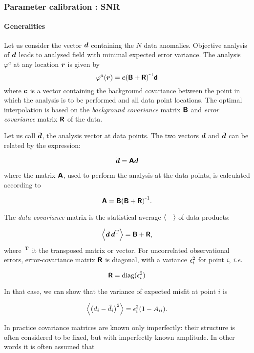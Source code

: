 \begin{frame}[allowframebreaks]
\frametitle{Parameter calibration : SNR}
\framesubtitle{Generalities}

Let us consider the vector $\mbox{\boldmath $ d $}$ containing the $N$ data anomalies. Objective analysis of $\mbox{\boldmath $ d $}$ leads to analysed field with minimal expected error variance. The analysis $\varphi^a$ at any location $\mbox{\boldmath $ r $}$ is given by
\begin{equation}
\varphi^a(\mbox{\boldmath $ r $}) = \mbox{\boldmath $ c $} {( \mbox{\boldmath $ \protect\mathsf{B} $} + \mbox{\boldmath $ \protect\mathsf{R} $} )}^{ \mbox{\small{-}} 1} \mbox{\boldmath $ \protect\mathsf{d} $}
\end{equation}
where $\mbox{\boldmath $ c $}$ is a vector containing the background covariance between the point in which the analysis is to be performed and all data point locations. The optimal interpolation is based on the \textit{background covariance} matrix $\mbox{\boldmath $ \protect\mathsf{B} $}$ and \textit{error covariance} matrix $\mbox{\boldmath $ \protect\mathsf{R} $}$ of the data.
 
Let us call $\tilde{\mbox{\boldmath $ d $}}$, the analysis vector at data points. The two vectors ${\mbox{\boldmath $ d $}}$ and $\tilde{\mbox{\boldmath $ d $}}$ can be related by the expression:

\begin{equation}
\tilde{\mbox{\boldmath $ d $}}  =  \mbox{\boldmath $ \protect\mathsf{A} $} \mbox{\boldmath $ d $}
\end{equation}

where the matrix $\mbox{\boldmath $ \protect\mathsf{A} $}$, used to perform the analysis at the data points, is calculated according to 

\begin{equation}
\mbox{\boldmath $ \protect\mathsf{A} $}=\mbox{\boldmath $ \protect\mathsf{B} $} {( \mbox{\boldmath $ \protect\mathsf{B} $} + \mbox{\boldmath $ \protect\mathsf{R} $} )}^{ \mbox{\small{-}} 1}.
\end{equation}

The \textit{data-covariance} matrix is the statistical average $\left\langle \quad \right\rangle$ of data products:

\begin{equation}
\left\langle \mbox{\boldmath $ d $} \, {\mbox{\boldmath $ d $}}^{\protect\mathrm{T}} \right\rangle = \mbox{\boldmath $ \protect\mathsf{B} $}+\mbox{\boldmath $ \protect\mathsf{R} $}, 
\label{eq:datavar}
\end{equation}
where ${\,}^{\protect\mathrm{T}}$ it the transposed matrix or vector. For uncorrelated observational errors, error-covariance matrix $\mbox{\boldmath $ \protect\mathsf{R} $}$ is diagonal, with a variance $\epsilon_i^2$ for point $i$, \textit{i.e.}

\[
\matr{R} = \mathrm{diag}(\noise_i^2)%
\]

In that case, we can show that the variance of expected misfit at point $i$ is
 
\begin{equation}
\left\langle \left(d_i - \tilde{d}_i\right)^2 \right\rangle = \epsilon_i^2 (1 - A_{ii}).
\label{eq:epsilonmisfit}
\end{equation}

In practice covariance matrices are known only imperfectly: their structure is often considered to be
fixed, but with imperfectly known amplitude. In other words it is often assumed that


\end{frame}

